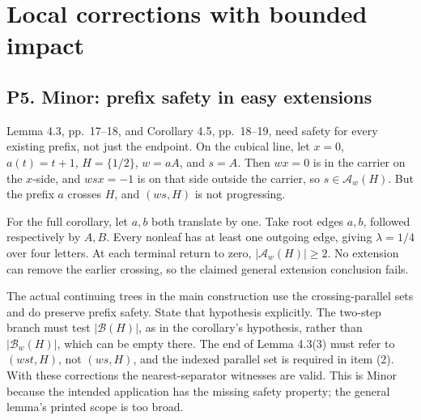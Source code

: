 \documentclass[10pt]{article}
\begin{document}
\section*{Local corrections with bounded impact}
\subsection*{P5. Minor: prefix safety in easy extensions}
Lemma 4.3, pp. 17–18, and Corollary 4.5, pp. 18–19, need safety for every existing prefix, not just the endpoint. On the cubical line, let \(x=0\), \(a(t)=t+1\), \(H=\{1/2\}\), \(w=aA\), and \(s=A\). Then \(wx=0\) is in the carrier on the \(x\)-side, and \(wsx=-1\) is on that side outside the carrier, so \(s\in\mathcal A_w(H)\). But the prefix \(a\) crosses \(H\), and \((ws,H)\) is not progressing.\par
For the full corollary, let \(a,b\) both translate by one. Take root edges \(a,b\), followed respectively by \(A,B\). Every nonleaf has at least one outgoing edge, giving \(\lambda=1/4\) over four letters. At each terminal return to zero, \(|\mathcal A_w(H)|\ge2\). No extension can remove the earlier crossing, so the claimed general extension conclusion fails.\par
The actual continuing trees in the main construction use the crossing-parallel sets and do preserve prefix safety. State that hypothesis explicitly. The two-step branch must test \(|\mathcal B(H)|\), as in the corollary’s hypothesis, rather than \(|\mathcal B_w(H)|\), which can be empty there. The end of Lemma 4.3(3) must refer to \((wst,H)\), not \((ws,H)\), and the indexed parallel set is required in item (2). With these corrections the nearest-separator witnesses are valid. This is Minor because the intended application has the missing safety property; the general lemma’s printed scope is too broad.\par
\end{document}
